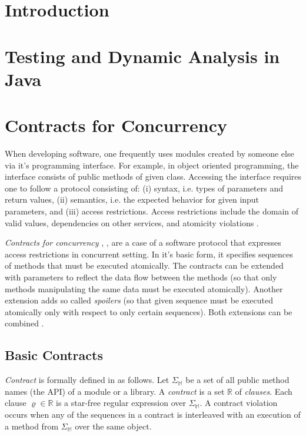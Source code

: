 \chapter{Introduction}

\todo{}

\chapter{Testing and Dynamic Analysis in Java}

\todo{}

\chapter{Contracts for Concurrency}


When developing software, one frequently uses modules created by someone else
via it's programming interface. For example, in object oriented programming, the
interface consists of public methods of given class. Accessing the interface
requires one to follow a protocol consisting of: (i) syntax, i.e. types of
parameters and return values, (ii) semantics, i.e. the expected behavior for
given input parameters, and (iii) access restrictions. Access restrictions
include the domain of valid values, dependencies on other services, and
atomicity violations \cite{FITPUB11510}.

\emph{Contracts for concurrency} \cite{FITPUB10817},
\cite{DBLP:journals/corr/SousaDFL15}, are a case of a software protocol that
expresses access restrictions in concurrent setting. In it's basic form, it
specifies sequences of methods that must be executed atomically. The contracts
can be extended with parameters to reflect the data flow between the methods (so
that only methods manipulating the same data must be executed atomically).
Another extension adds so called \emph{spoilers} (so that given sequence must be
executed atomically only with respect to only certain sequences). Both
extensions can be combined \cite{FITPUB11510}.

\section{Basic Contracts}

\emph{Contract} is formally defined in \cite{FITPUB10817} as follows. Let
$\Sigma_\mathbb{M}$ be a set of all public method names (the API) of a module or
a library. A \emph{contract} is a set $\mathbb{R}$ of \emph{clauses}. Each
clause $\varrho \in \mathbb{R}$ is a star-free regular expression over
$\Sigma_\mathbb{M}$. A contract violation occurs when any of the sequences in a
contract is interleaved with an execution of a method from $\Sigma_\mathbb{M}$
over the same object.

